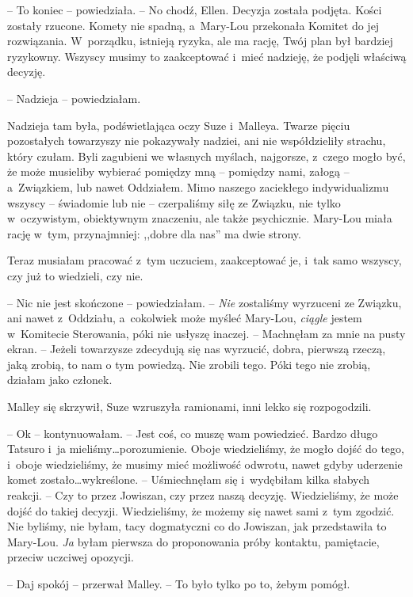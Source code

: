 \documentclass[oneside,polish,11pt,sfheadings]{mwbk}
\begin{document}
-- To koniec -- powiedziała. -- No chodź, Ellen. Decyzja została podjęta.
Kości zostały rzucone. Komety nie spadną, a~Mary-Lou przekonała Komitet
do jej rozwiązania. W~porządku, istnieją ryzyka, ale ma rację, Twój plan
był bardziej ryzykowny. Wszyscy musimy to zaakceptować i~mieć nadzieję,
że podjęli właściwą decyzję.

-- Nadzieja -- powiedziałam.

Nadzieja tam była, podświetlająca oczy Suze i~Malleya. Twarze pięciu
pozostałych towarzyszy nie pokazywały nadziei, ani nie współdzieliły
strachu, który czułam. Byli zagubieni we własnych myślach, najgorsze, z~czego mogło być, że może musieliby wybierać pomiędzy mną -- pomiędzy
nami, załogą -- a~Związkiem, lub nawet Oddziałem. Mimo naszego zaciekłego
indywidualizmu wszyscy -- świadomie lub nie -- czerpaliśmy siłę ze
Związku, nie tylko w~oczywistym, obiektywnym znaczeniu, ale także
psychicznie. Mary-Lou miała rację w~tym, przynajmniej: ,,dobre dla nas''
ma dwie strony.

Teraz musiałam pracować z~tym uczuciem, zaakceptować je, i~tak samo
wszyscy, czy już to wiedzieli, czy nie.

-- Nic nie jest skończone -- powiedziałam. -- \textit{Nie} zostaliśmy
wyrzuceni ze Związku, ani nawet z~Oddziału, a~cokolwiek może myśleć
Mary-Lou, \textit{ciągle} jestem w~Komitecie Sterowania, póki nie usłyszę
inaczej. -- Machnęłam za mnie na pusty ekran. -- Jeżeli towarzysze
zdecydują się nas wyrzucić, dobra, pierwszą rzeczą, jaką zrobią, to nam
o tym powiedzą. Nie zrobili tego. Póki tego nie zrobią, działam jako
członek.

Malley się skrzywił, Suze wzruszyła ramionami, inni lekko się
rozpogodzili.

-- Ok -- kontynuowałam. -- Jest coś, co muszę wam powiedzieć. Bardzo długo
Tatsuro i~ja mieliśmy\ldots  porozumienie. Oboje wiedzieliśmy, że mogło
dojść do tego, i~oboje wiedzieliśmy, że musimy mieć możliwość odwrotu,
nawet gdyby uderzenie komet zostało\ldots  wykreślone. -- Uśmiechnęłam się i~wydębiłam kilka słabych reakcji. -- Czy to przez Jowiszan, czy przez
naszą decyzję. Wiedzieliśmy, że może dojść do takiej decyzji.
Wiedzieliśmy, że możemy się nawet sami z~tym zgodzić. Nie byliśmy, nie
byłam, tacy dogmatyczni co do Jowiszan, jak przedstawiła to Mary-Lou.
\textit{Ja} byłam pierwsza do proponowania próby kontaktu, pamiętacie,
przeciw uczciwej opozycji.

-- Daj spokój -- przerwał Malley. -- To było tylko po to, żebym pomógł.
\end{document}
